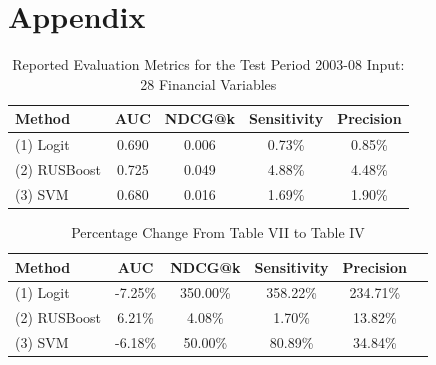 \documentclass[conference]{IEEEtran}
\begin{document}
\newpage
\section*{Appendix}
\begin{table}[H]
\caption{Reported Evaluation Metrics for the Test Period 2003-08 \newline Input: 28 Financial Variables}
\centering
\begin{tabular}{p{2.495cm}cccc}
\toprule
\textbf{Method} & \textbf{AUC} & \textbf{NDCG@k} & \textbf{Sensitivity} & \textbf{Precision} \\
\midrule
\raggedright (1) Logit & 0.690 & 0.006 & 0.73\% & 0.85\% \\
\raggedright (2) RUSBoost & 0.725 & 0.049 & 4.88\% & 4.48\% \\
\raggedright (3) SVM & 0.680 & 0.016 & 1.69\% & 1.90\% \\
\bottomrule
\end{tabular}
\label{tab:performance}
\end{table}
\begin{table}[H]
\caption{Percentage Change From Table VII to Table IV}
\centering
\begin{tabular}{p{2.295cm}ccccc}
\toprule
\textbf{Method} & \textbf{AUC} & \textbf{NDCG@k} & \textbf{Sensitivity} & \textbf{Precision} \\
\midrule
\raggedright (1) Logit & -7.25\% & 350.00\% & 358.22\% & 234.71\% \\
\raggedright (2) RUSBoost & 6.21\% & 4.08\% & 1.70\% & 13.82\% \\
\raggedright (3) SVM & -6.18\% & 50.00\% & 80.89\% & 34.84\% \\

\bottomrule
\end{tabular}
\end{table}
\end{document}
